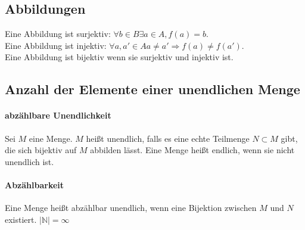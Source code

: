 \subsection{Abbildungen}
Eine Abbildung ist {\sc surjektiv}: $\forall b \in B \exists a \in A, f(a) = b$.\\
Eine Abbildung ist {\sc injektiv}: $\forall a,a' \in A a\neq a' \Rightarrow f(a) \neq f(a')$.\\
Eine Abbildung ist {\sc bijektiv} wenn sie surjektiv und injektiv ist.

\subsection{Anzahl der Elemente einer unendlichen Menge}
\paragraph{abzählbare Unendlichkeit} Sei $M$ eine Menge. $M$ heißt  unendlich, falls es eine echte Teilmenge $N\subset M$ gibt, die sich bijektiv auf $M$ abbilden lässt. Eine Menge heißt endlich, wenn sie nicht unendlich ist.
\paragraph{Abzählbarkeit} Eine Menge heißt abzählbar unendlich, wenn eine Bijektion zwischen $M$ und $N$ existiert. $|\mathbb{N}| = \infty$